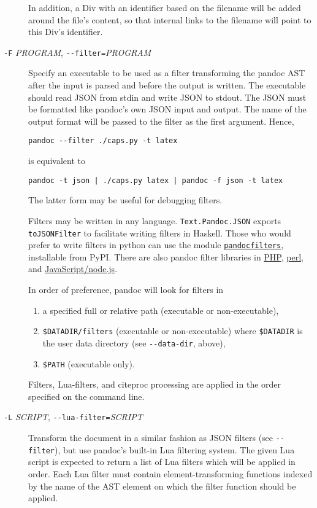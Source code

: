 \documentclass[
  a4paper,
]{article}
\begin{document}
\begin{description}
In addition, a Div with an identifier based on the filename will be
added around the file's content, so that internal links to the filename
will point to this Div's identifier.
\item[\texttt{-F} \emph{PROGRAM}, \texttt{-\/-filter=}\emph{PROGRAM}]
Specify an executable to be used as a filter transforming the pandoc AST
after the input is parsed and before the output is written. The
executable should read JSON from stdin and write JSON to stdout. The
JSON must be formatted like pandoc's own JSON input and output. The name
of the output format will be passed to the filter as the first argument.
Hence,

\begin{verbatim}
pandoc --filter ./caps.py -t latex
\end{verbatim}

is equivalent to

\begin{verbatim}
pandoc -t json | ./caps.py latex | pandoc -f json -t latex
\end{verbatim}

The latter form may be useful for debugging filters.

Filters may be written in any language. \texttt{Text.Pandoc.JSON}
exports \texttt{toJSONFilter} to facilitate writing filters in Haskell.
Those who would prefer to write filters in python can use the module
\href{https://github.com/jgm/pandocfilters}{\texttt{pandocfilters}},
installable from PyPI. There are also pandoc filter libraries in
\href{https://github.com/vinai/pandocfilters-php}{PHP},
\href{https://metacpan.org/pod/Pandoc::Filter}{perl}, and
\href{https://github.com/mvhenderson/pandoc-filter-node}{JavaScript/node.js}.

In order of preference, pandoc will look for filters in

\begin{enumerate}
\def\labelenumi{\arabic{enumi}.}
\item
  a specified full or relative path (executable or non-executable),
\item
  \texttt{\$DATADIR/filters} (executable or non-executable) where
  \texttt{\$DATADIR} is the user data directory (see
  \texttt{-\/-data-dir}, above),
\item
  \texttt{\$PATH} (executable only).
\end{enumerate}

Filters, Lua-filters, and citeproc processing are applied in the order
specified on the command line.
\item[\texttt{-L} \emph{SCRIPT}, \texttt{-\/-lua-filter=}\emph{SCRIPT}]
Transform the document in a similar fashion as JSON filters (see
\texttt{-\/-filter}), but use pandoc's built-in Lua filtering system.
The given Lua script is expected to return a list of Lua filters which
will be applied in order. Each Lua filter must contain
element-transforming functions indexed by the name of the AST element on
which the filter function should be applied.


\end{description}
\end{document}
